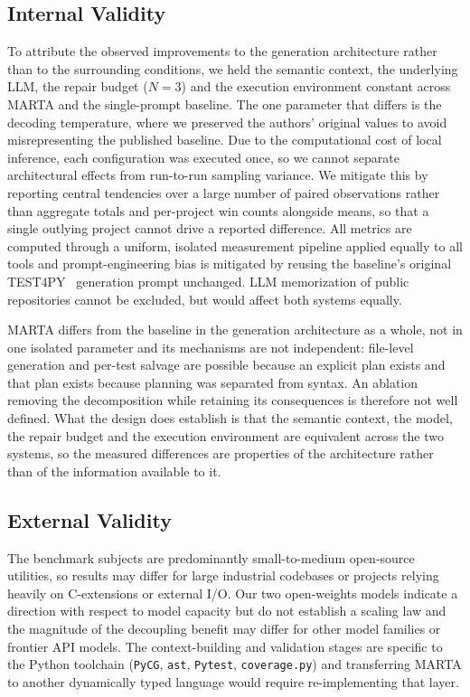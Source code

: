 \documentclass{llncs}
\begin{document}
\subsection{Internal Validity}
\label{sec:internal-validity}

To attribute the observed improvements to the generation architecture rather than to
the surrounding conditions, we held the semantic context, the underlying LLM, the
repair budget ($N=3$) and the execution environment constant across MARTA and the
single-prompt baseline. The one parameter that differs is the decoding temperature,
where we preserved the authors' original values to avoid misrepresenting the
published baseline. Due to the computational cost of local inference, each
configuration was executed once, so we cannot separate architectural effects from
run-to-run sampling variance. We mitigate this by reporting central tendencies over a
large number of paired observations rather than aggregate totals and per-project win
counts alongside means, so that a single outlying project cannot drive a reported
difference. All metrics are computed through a uniform, isolated measurement pipeline
applied equally to all tools and prompt-engineering bias is mitigated by reusing the
baseline's original TEST4PY~\cite{test4py2025} generation prompt unchanged. LLM
memorization of public repositories cannot be excluded, but would affect both systems
equally.

MARTA differs from the baseline in the generation architecture
as a whole, not in one isolated parameter and its mechanisms are not independent:
file-level generation and per-test salvage are possible because an explicit plan
exists and that plan exists because planning was separated from syntax. An ablation
removing the decomposition while retaining its consequences is therefore not well
defined. What the design does establish is that the semantic context, the model, the
repair budget and the execution environment are equivalent across the two systems, so
the measured differences are properties of the architecture rather than of the
information available to it.

\subsection{External Validity}
The benchmark subjects are predominantly small-to-medium open-source utilities, so
results may differ for large industrial codebases or projects relying heavily on
C-extensions or external I/O. Our two open-weights models indicate a direction with
respect to model capacity but do not establish a scaling law and the magnitude of
the decoupling benefit may differ for other model families or frontier API models.
The context-building and validation stages are specific
to the Python toolchain (\texttt{PyCG}, \texttt{ast}, \texttt{Pytest},
\texttt{coverage.py}) and transferring MARTA to another dynamically typed language
would require re-implementing that layer.
\end{document}
